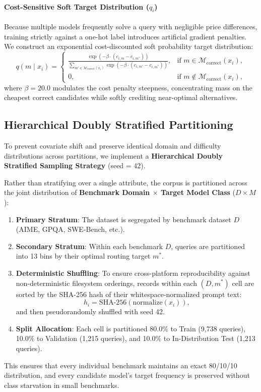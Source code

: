 \documentclass[11pt,a4paper]{article}
\begin{document}
\paragraph{Cost-Sensitive Soft Target Distribution ($q_i$)}
Because multiple models frequently solve a query with negligible price differences, training strictly against a one-hot label introduces artificial gradient penalties. We construct an exponential cost-discounted soft probability target distribution:
\begin{equation}
q(m \mid x_i) = \begin{cases} 
\frac{\exp\left(-\beta \cdot (c_{i,m} - c_{i,m^*})\right)}{\sum_{m' \in \mathcal{M}_{\text{correct}}(x_i)} \exp\left(-\beta \cdot (c_{i,m'} - c_{i,m^*})\right)}, & \text{if } m \in \mathcal{M}_{\text{correct}}(x_i), \\
0, & \text{if } m \notin \mathcal{M}_{\text{correct}}(x_i),
\end{cases}
\end{equation}
where $\beta = 20.0$ modulates the cost penalty steepness, concentrating mass on the cheapest correct candidates while softly crediting near-optimal alternatives.

\subsection{Hierarchical Doubly Stratified Partitioning}
\label{subsec:stratification}

To prevent covariate shift and preserve identical domain and difficulty distributions across partitions, we implement a \textbf{Hierarchical Doubly Stratified Sampling Strategy} (seed = 42).

Rather than stratifying over a single attribute, the corpus is partitioned across the joint distribution of \textbf{Benchmark Domain $\times$ Target Model Class} ($D \times M$):
\begin{enumerate}
    \item \textbf{Primary Stratum}: The dataset is segregated by benchmark dataset $D$ (AIME, GPQA, SWE-Bench, etc.).
    \item \textbf{Secondary Stratum}: Within each benchmark $D$, queries are partitioned into 13 bins by their optimal routing target $m^*$.
    \item \textbf{Deterministic Shuffling}: To ensure cross-platform reproducibility against non-deterministic filesystem orderings, records within each $(D, m^*)$ cell are sorted by the SHA-256 hash of their whitespace-normalized prompt text:
    \begin{equation}
    h_i = \text{SHA-256}(\text{normalize}(x_i)),
    \end{equation}
    and then pseudorandomly shuffled with seed 42.
    \item \textbf{Split Allocation}: Each cell is partitioned 80.0\% to Train (9,738 queries), 10.0\% to Validation (1,215 queries), and 10.0\% to In-Distribution Test (1,213 queries).
\end{enumerate}
This ensures that every individual benchmark maintains an exact 80/10/10 distribution, and every candidate model's target frequency is preserved without class starvation in small benchmarks.
\end{document}
